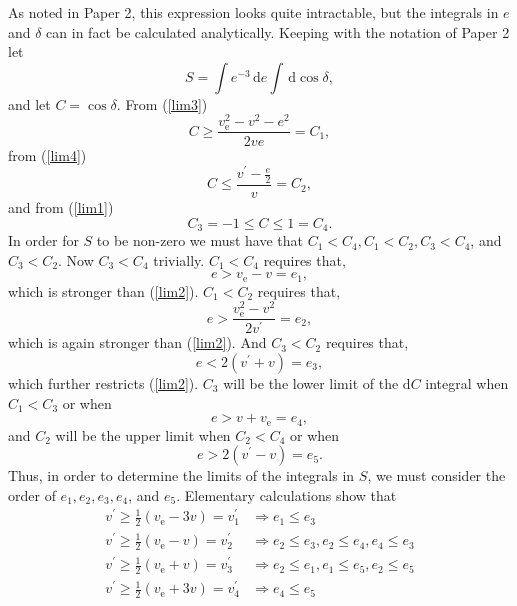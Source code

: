 \documentclass[aps,floatfix,prd,showpacs]{revtex4}
\newcommand{\diff}{\mathrm{d}}
\newcommand{\vesc}{v_{\text{e}}}
\newcommand{\vp}{v^\prime}
\begin{document}
As noted in Paper 2, this expression looks quite intractable, but the integrals in $e$ and $\delta$ can in fact be calculated analytically.  Keeping with the notation of Paper 2 let
\begin{equation}
S = \int{e^{-3}}\,\diff e\int{}\,\diff \cos\delta,
\end{equation}
%
and let $C = \cos\delta$. From (\ref{lim3})
\begin{equation}
C \ge \frac{\vesc^2-v^2-e^2}{2ve} = C_1,
\end{equation}
from (\ref{lim4})
\begin{equation}
C \le \frac{\vp - \frac{e}{2}}{v} = C_2,
\end{equation}
and from (\ref{lim1})
\begin{equation}
C_3 = -1 \le C \le 1 = C_4.
\end{equation}
%
%
In order for $S$ to be non-zero we must have that $C_1 < C_4, C_1 < C_2, C_3 < C_4$, and $C_3 < C_2$. Now $C_3 < C_4$ trivially. $C_1 < C_4$ requires that,
%
\begin{equation}
e > \vesc - v = e_1,
\label{e1}
\end{equation}
which is stronger than (\ref{lim2}). $C_1 < C_2$ requires that,
\begin{equation}
e > \frac{\vesc^2 - v^2}{2\vp} = e_2,
\label{e2}
\end{equation}
which is again stronger than (\ref{lim2}).  And $C_3 < C_2$ requires that,
\begin{equation}
e < 2(\vp + v) = e_3,
\label{e3}
\end{equation}
which further restricts (\ref{lim2}).  $C_3$ will be the lower limit of the $\diff C$ integral when $C_1 < C_3$ or when 
\begin{equation}
e > v + \vesc = e_4,
\end{equation}
and $C_2$ will be the upper limit when $C_2 < C_4$ or when 
\begin{equation}
e > 2(\vp - v) = e_5.  
\end{equation}
%
%
Thus, in order to determine the limits of the integrals in $S$, we must consider the order of $e_1, e_2, e_3, e_4$, and $e_5$.  Elementary calculations show that 
% 
\begin{equation}
\begin{split}
	\vp \ge \frac{1}{2}(\vesc - 3v) = \vp_1 &\Rightarrow e_1 \le e_3\\
	\vp \ge \frac{1}{2}(\vesc - v) = \vp_2 &\Rightarrow e_2 \le e_3, e_2 \le e_4, e_4 \le e_3\\
	\vp \ge \frac{1}{2}(\vesc + v) = \vp_3 &\Rightarrow e_2 \le e_1, e_1 \le e_5, e_2 \le e_5\\
	\vp \ge \frac{1}{2}(\vesc + 3v) = \vp_4 &\Rightarrow e_4 \le e_5\\
\end{split}
\end{equation}
\end{document}

